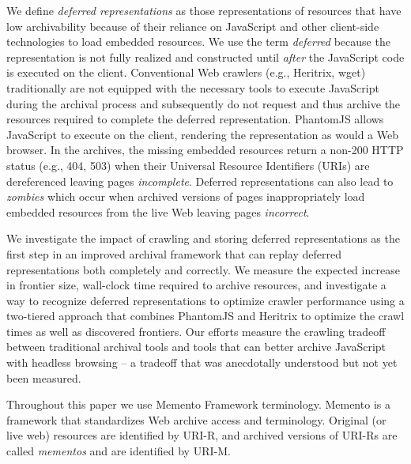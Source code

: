 \documentclass{ipres_proc_article-sp}
\begin{document}
We define \emph{deferred representations} as those representations of resources that have low archivability because of their reliance on JavaScript and other client-side technologies to load embedded resources. We use the term \emph{deferred} because the representation is not fully realized and constructed until \emph{after} the JavaScript code is executed on the client. 
Conventional Web crawlers (e.g., Heritrix, wget) traditionally are not equipped with the necessary tools to execute JavaScript during the archival process \cite{googleJS} and subsequently do not request and thus archive the resources required to complete the deferred representation. PhantomJS allows JavaScript to execute on the client, rendering the representation as would a Web browser. In the archives, the missing embedded resources return a non-200 HTTP status (e.g., 404, 503) when their Universal Resource Identifiers (URIs) are dereferenced leaving pages \emph{incomplete}. Deferred representations can also lead to \emph{zombies} which occur when archived versions of pages inappropriately load embedded resources from the live Web \cite{zombies} leaving pages \emph{incorrect}. %

We investigate the impact of crawling and storing deferred representations as the first step in an improved archival framework that can replay deferred representations both completely and correctly. We measure the expected increase in frontier size, wall-clock time required to archive resources, and investigate a way to recognize deferred representations to optimize crawler performance using a two-tiered approach that combines PhantomJS and Heritrix to optimize the crawl times as well as discovered frontiers. Our efforts measure the crawling tradeoff between traditional archival tools and tools that can better archive JavaScript with headless browsing -- a tradeoff that was anecdotally understood but not yet been measured.

Throughout this paper we use Memento Framework terminology. Memento \cite{nelson:memento:tr} is a framework that standardizes Web archive access and terminology. Original (or live web) resources are identified by URI-R, and archived versions of URI-Rs are called \emph{mementos} and are identified by URI-M. 
\end{document}
